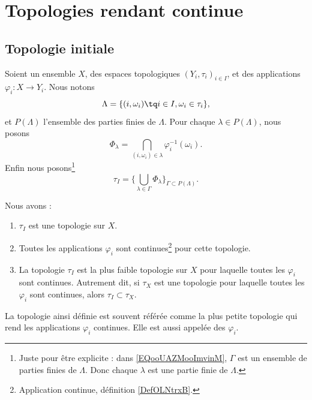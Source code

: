 \section{Topologies rendant continue}

\subsection{Topologie initiale}


\begin{propositionDef}     \label{PROPooGOEVooZBAOQh}
	Soient un ensemble \( X\), des espaces topologiques \( (Y_i,\tau_i)_{i\in I}\), et des applications \( \varphi_i\colon X\to Y_i\). Nous notons
	\begin{equation}
		\Lambda=\{ (i,\omega_i)\tq i\in I, \omega_i\in \tau_i \},
	\end{equation}
	et \( P(\Lambda)\) l'ensemble des parties finies de \( \Lambda\). Pour chaque \( \lambda\in P(\Lambda)\), nous posons
	\begin{equation}
		\Phi_{\lambda}=\bigcap_{(i,\omega_i)\in \lambda}\varphi_i^{-1}(\omega_i).
	\end{equation}
	Enfin nous posons\footnote{ Juste pour être explicite : dans \eqref{EQooUAZMooImvinM}, \( \Gamma\) est un ensemble de parties finies de \( \Lambda\). Donc chaque \( \lambda\) est une partie finie de \( \Lambda\). }
	\begin{equation}		\label{EQooUAZMooImvinM}
		\tau_I=\Big\{   \bigcup_{\lambda\in \Gamma}\Phi_{\lambda}  \Big\}_{\Gamma\subset P(\Lambda)}.
	\end{equation}


	Nous avons :
	\begin{enumerate}
		\item
		      \( \tau_I\) est une topologie sur \( X\).
		\item
		      Toutes les applications \( \varphi_i\) sont continues\footnote{Application continue, définition \ref{DefOLNtrxB}.} pour cette topologie.
		\item		\label{ITEMooJLXPooMokQuP}
		      La topologie \( \tau_I\) est la plus faible topologie sur \( X\) pour laquelle toutes les \( \varphi_i\) sont continues. Autrement dit, si \( \tau_X\) est une topologie pour laquelle toutes les \( \varphi_i\) sont continues, alors \( \tau_I\subset\tau_X\).
	\end{enumerate}

	La topologie ainsi définie est souvent référée comme la plus petite topologie qui rend les applications \( \varphi_i\) continues. Elle est aussi appelée  des \( \varphi_i\).
\end{propositionDef}

